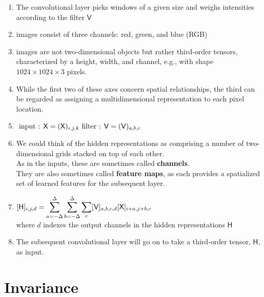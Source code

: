 \begin{enumerate}[itemsep=0.15cm]
    \item The convolutional layer picks windows of a given size and weighs intensities according to the filter $\mathsf{V}$

    \item images consist of three channels: red, green, and blue (RGB)

    \item images are not two-dimensional objects but rather third-order tensors, characterized by a height, width, and channel, e.g., with shape $1024 \times 1024 \times 3$ pixels.

    \item While the first two of these axes concern spatial relationships, the third can be regarded as assigning a multidimensional representation to each pixel location.

    \item[] 
    $
        \hfill
        \text{ input : } \mathsf{X} = (\mathsf{X})_{i,j,k}
        \hfill
        \text{ filter : } \mathsf{V} = (\mathsf{V})_{a,b,c}
        \hfill
    $

    \item We could think of the hidden representations as comprising a number of two-dimensional grids stacked on top of each other.\\
    As in the inputs, these are sometimes called \textbf{channels}.\\
    They are also sometimes called \textbf{feature maps}, as each provides a spatialized set of learned features for the subsequent layer.

    \item[] 
    $
        \hfill
        [\mathsf{H}]_{i,j,d} 
        = \dsum_{a = -\Delta}^{\Delta} 
            \dsum_{b = -\Delta}^{\Delta} 
            \dsum_c [\mathsf{V}]_{a, b, c, d} [\mathsf{X}]_{i+a, j+b, c}
        \hfill
    $\\[1ex]
    where $d$ indexes the output channels in the hidden representations $\mathsf{H}$

    \item The subsequent convolutional layer will go on to take a third-order tensor, $\mathsf{H}$, as input.

    
\end{enumerate}




\section{Invariance \cite{dnn-1}}

